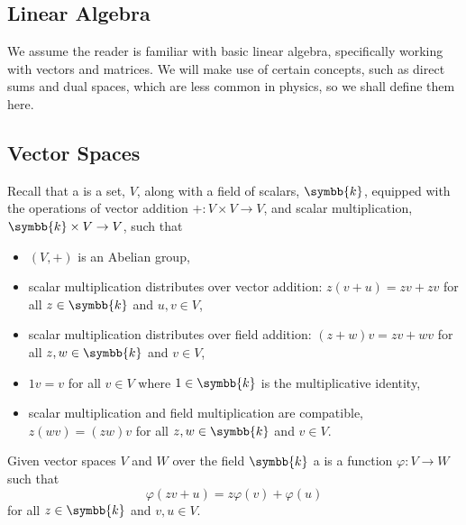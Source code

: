 \documentclass[fleqn]{NotesClass}
\renewcommand{\field}{\symbb{k}}
\begin{document}
    
    
    
    \printbibliography
    \appendixpage
    \begin{appendices}
        \chapter{Linear Algebra}\label{sec:linear algebra}
        We assume the reader is familiar with basic linear algebra, specifically working with vectors and matrices.
        We will make use of certain concepts, such as direct sums and dual spaces, which are less common in physics, so we shall define them here.
        
        \section{Vector Spaces}
        Recall that a  is a set, \(V\), along with a field of scalars, \(\field\), equipped with the operations of vector addition \(+ \colon V \times V \to V\), and scalar multiplication, \(\field \times V \to V\), such that
        \begin{itemize}
            \item \((V, +)\) is an Abelian group,
            \item scalar multiplication distributes over vector addition: \(z(v + u) = zv + zv\) for all \(z \in \field\) and \(u, v \in V\),
            \item scalar multiplication distributes over field addition: \((z + w)v = zv + wv\) for all \(z, w \in \field\) and \(v \in V\),
            \item \(1v = v\) for all \(v \in V\) where \(1 \in \field\) is the multiplicative identity,
            \item scalar multiplication and field multiplication are compatible, \(z(wv) = (zw)v\) for all \(z, w \in \field\) and \(v \in V\).
        \end{itemize}
        
        Given vector spaces \(V\) and \(W\) over the field \(\field\) a  is a function \(\varphi \colon V \to W\) such that
        \begin{equation}
            \varphi(zv + u) = z\varphi(v) + \varphi(u)
        \end{equation}
        for all \(z\in \field\) and \(v, u \in V\).
        

\end{appendices}
\end{document}
